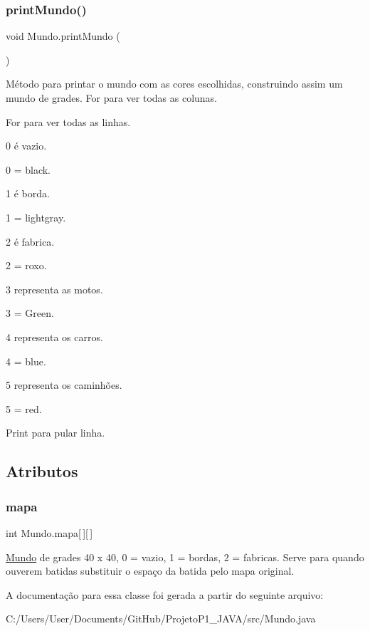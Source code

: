 \subsubsection{\texorpdfstring{print\+Mundo()}{printMundo()}}
{\footnotesize\ttfamily void Mundo.\+print\+Mundo (\begin{DoxyParamCaption}{ }\end{DoxyParamCaption})\hspace{0.3cm}{\ttfamily [inline]}}

Método para printar o mundo com as cores escolhidas, construindo assim um mundo de grades. For para ver todas as colunas.

For para ver todas as linhas.

0 é vazio.

0 = black.

1 é borda.

1 = lightgray.

2 é fabrica.

2 = roxo.

3 representa as motos.

3 = Green.

4 representa os carros.

4 = blue.

5 representa os caminhões.

5 = red.

Print para pular linha. 

\subsection{Atributos}
\mbox{\label{class_mundo_a8332b2d52b9f317338a4d6cbe10bbcbb}} 
\subsubsection{\texorpdfstring{mapa}{mapa}}
{\footnotesize\ttfamily int Mundo.\+mapa\mbox{[}$\,$\mbox{]}\mbox{[}$\,$\mbox{]}\hspace{0.3cm}{\ttfamily [private]}}

\mbox{\hyperlink{class_mundo}{Mundo}} de grades 40 x 40, 0 = vazio, 1 = bordas, 2 = fabricas. Serve para quando ouverem batidas substituir o espaço da batida pelo mapa original. 

A documentação para essa classe foi gerada a partir do seguinte arquivo\+:\begin{DoxyCompactItemize}
\item 
C\+:/\+Users/\+User/\+Documents/\+Git\+Hub/\+Projeto\+P1\+\_\+\+J\+A\+V\+A/src/Mundo.\+java\end{DoxyCompactItemize}
